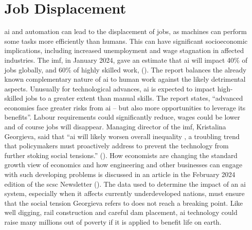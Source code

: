 \section{Job Displacement}
\Gls{ai} and automation can lead to the displacement of jobs, as machines can perform some tasks more efficiently than humans. This can have significant socioeconomic implications, including increased unemployment and wage stagnation in affected industries. The \gls{imf}, in January 2024, gave an estimate that \gls{ai} will impact 40\% of jobs globally, and 60\% of highly skilled work, (\cite{citation:Cazziniga2024}). The report balances the already known complementary nature of \gls{ai} to human work against the likely detrimental aspects. Unusually for technological advances, \gls{ai} is expected to impact high-skilled jobs to a greater extent than manual skills. The report states, ``advanced economies face greater risks from \gls{ai} -- but also more opportunities to leverage its benefits''. Labour requirements could significantly reduce, wages could be lower and of course jobs will disappear.  Managing director of the \gls{imf}, Kristalina Georgieva, said that ``\gls{ai} will likely worsen overall inequality , a troubling trend that policymakers must proactively address to prevent the technology from further stoking social tensions.'' (\cite{citation:toh2024}). How economists are changing the standard growth view of economics and how engineering and other businesses can engage with such  developing problems is discussed in an article in the February 2024 edition of the \gls{scsc} Newsletter (\cite{citation:SCSC193}). The data used to determine the impact of an \gls{ai} system, especially when it affects currently underdeveloped nations, must ensure that the social tension Georgieva refers to does not reach a breaking point. Like well digging, rail construction and careful dam placement, \gls{ai} technology could raise many millions out of poverty if it is applied to benefit life on earth.

